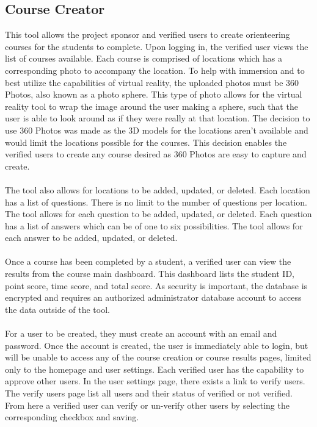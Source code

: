 \subsection{Course Creator}
This tool allows the project sponsor and verified users to create orienteering courses for the students to complete. Upon logging in, the verified user views the list of courses available. Each course is comprised of locations which has a corresponding photo to accompany the location. To help with immersion and to best utilize the capabilities of virtual reality, the uploaded photos must be 360 Photos, also known as a photo sphere. This type of photo allows for the virtual reality tool to wrap the image around the user making a sphere, such that the user is able to look around as if they were really at that location. The decision to use 360 Photos was made as the 3D models for the locations aren't available and would limit the locations possible for the courses. This decision enables the verified users to create any course desired as 360 Photos are easy to capture and create. \\
\\
 The tool also allows for locations to be added, updated, or deleted. Each location has a list of questions. There is no limit to the number of questions per location. The tool allows for each question to be added, updated, or deleted. Each question has a list of answers which can be of one to six possibilities. The tool allows for each answer to be added, updated, or deleted. \\
\\
Once a course has been completed by a student, a verified user can view the results from the course main dashboard. This dashboard lists the student ID, point score, time score, and total score. As security is important, the database is encrypted and requires an authorized administrator database account to access the data outside of the tool. \\
\\
For a user to be created, they must create an account with an email and password. Once the account is created, the user is immediately able to login, but will be unable to access any of the course creation or course results pages, limited only to the homepage and user settings. Each verified user has the capability to approve other users. In the user settings page, there exists a link to verify users. The verify users page list all users and their status of verified or not verified. From here a verified user can verify or un-verify other users by selecting the corresponding checkbox and saving. 
\clearpage

